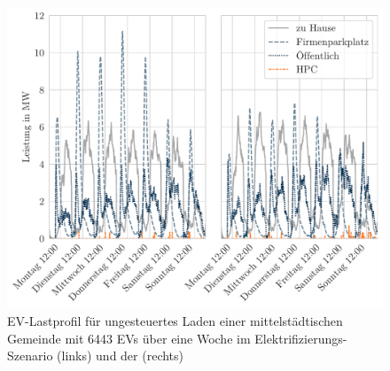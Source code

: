 \begin{figure}[H]
    \centering
    \includegraphics[width=\textwidth]{Bilder/example_load_profile}
    \caption{EV-Lastprofil für ungesteuertes Laden einer mittelstädtischen Gemeinde mit \num{6443} \glspl{EV} über eine Woche im Elektrifizierungs-Szenario (links) und der \SzeFirmenparkplatz (rechts)}\label{fig:example_load_profile}
\end{figure}
